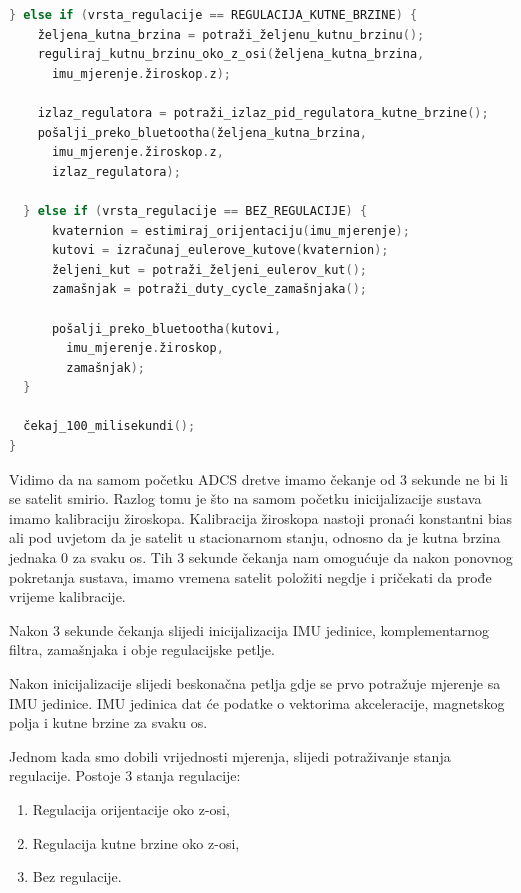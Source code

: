 \documentclass[times, utf8, diplomski, numeric]{templates/template}
\begin{document}
{{{{\begin{lstlisting}[language=C]
  } else if (vrsta_regulacije == REGULACIJA_KUTNE_BRZINE) {
    željena_kutna_brzina = potraži_željenu_kutnu_brzinu();
    reguliraj_kutnu_brzinu_oko_z_osi(željena_kutna_brzina, 
      imu_mjerenje.žiroskop.z);

    izlaz_regulatora = potraži_izlaz_pid_regulatora_kutne_brzine();
    pošalji_preko_bluetootha(željena_kutna_brzina, 
      imu_mjerenje.žiroskop.z, 
      izlaz_regulatora);

  } else if (vrsta_regulacije == BEZ_REGULACIJE) {
      kvaternion = estimiraj_orijentaciju(imu_mjerenje);
      kutovi = izračunaj_eulerove_kutove(kvaternion);
      željeni_kut = potraži_željeni_eulerov_kut();
      zamašnjak = potraži_duty_cycle_zamašnjaka();

      pošalji_preko_bluetootha(kutovi, 
        imu_mjerenje.žiroskop, 
        zamašnjak);
  }

  čekaj_100_milisekundi();
}               \end{lstlisting}

                Vidimo da na samom početku ADCS dretve imamo čekanje od 3 sekunde ne bi li se satelit smirio. Razlog tomu je što na samom početku inicijalizacije sustava imamo kalibraciju žiroskopa. Kalibracija žiroskopa nastoji pronaći konstantni bias ali pod uvjetom da je satelit u stacionarnom stanju, odnosno da je kutna brzina jednaka 0 za svaku os. Tih 3 sekunde čekanja nam omogućuje da nakon ponovnog pokretanja sustava, imamo vremena satelit položiti negdje i pričekati da prođe vrijeme kalibracije.

                Nakon 3 sekunde čekanja slijedi inicijalizacija IMU jedinice, komplementarnog filtra, zamašnjaka i obje regulacijske petlje.

                Nakon inicijalizacije slijedi beskonačna petlja gdje se prvo potražuje mjerenje sa IMU jedinice. IMU jedinica dat će podatke o vektorima akceleracije, magnetskog polja i kutne brzine za svaku os. 

                Jednom kada smo dobili vrijednosti mjerenja, slijedi potraživanje stanja regulacije. Postoje 3 stanja regulacije: 

                \begin{enumerate}
                    \item Regulacija orijentacije oko z-osi,
                    \item Regulacija kutne brzine oko z-osi,
                    \item Bez regulacije.
                \end{enumerate}

}}}}
\end{document}
